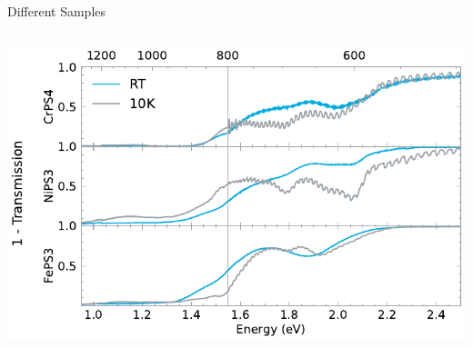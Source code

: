 \documentclass[
	10pt,
]{beamer}
\begin{document}
\begin{frame}{Different Samples}
	\begin{columns}
		\centering
		\includegraphics[width=\textwidth]{../figures/2024-03-15 Absorbance.pdf}


\end{columns}
\end{frame}
\end{document}
